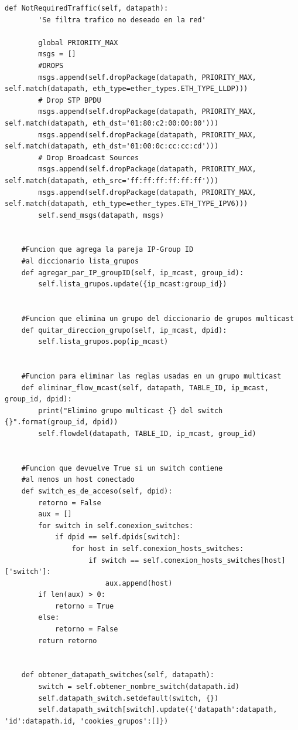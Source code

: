 \documentclass[12pt,a4paper,oneside]{book}
\begin{document}
\begin{lstlisting}[style=codigobase,  label = cod_correrP, caption= controlador.py]
    def NotRequiredTraffic(self, datapath):
        'Se filtra trafico no deseado en la red'

        global PRIORITY_MAX
        msgs = []
        #DROPS
        msgs.append(self.dropPackage(datapath, PRIORITY_MAX, self.match(datapath, eth_type=ether_types.ETH_TYPE_LLDP)))
        # Drop STP BPDU
        msgs.append(self.dropPackage(datapath, PRIORITY_MAX, self.match(datapath, eth_dst='01:80:c2:00:00:00')))
        msgs.append(self.dropPackage(datapath, PRIORITY_MAX, self.match(datapath, eth_dst='01:00:0c:cc:cc:cd')))
        # Drop Broadcast Sources
        msgs.append(self.dropPackage(datapath, PRIORITY_MAX, self.match(datapath, eth_src='ff:ff:ff:ff:ff:ff')))
        msgs.append(self.dropPackage(datapath, PRIORITY_MAX, self.match(datapath, eth_type=ether_types.ETH_TYPE_IPV6)))
        self.send_msgs(datapath, msgs)


    #Funcion que agrega la pareja IP-Group ID
    #al diccionario lista_grupos
    def agregar_par_IP_groupID(self, ip_mcast, group_id):
        self.lista_grupos.update({ip_mcast:group_id})


    #Funcion que elimina un grupo del diccionario de grupos multicast
    def quitar_direccion_grupo(self, ip_mcast, dpid):
        self.lista_grupos.pop(ip_mcast)


    #Funcion para eliminar las reglas usadas en un grupo multicast
    def eliminar_flow_mcast(self, datapath, TABLE_ID, ip_mcast, group_id, dpid):
        print("Elimino grupo multicast {} del switch {}".format(group_id, dpid))
        self.flowdel(datapath, TABLE_ID, ip_mcast, group_id)


    #Funcion que devuelve True si un switch contiene
    #al menos un host conectado
    def switch_es_de_acceso(self, dpid):
        retorno = False
        aux = []
        for switch in self.conexion_switches:
            if dpid == self.dpids[switch]:
                for host in self.conexion_hosts_switches:
                    if switch == self.conexion_hosts_switches[host]['switch']:
                        aux.append(host)
        if len(aux) > 0:
            retorno = True
        else:
            retorno = False
        return retorno


    def obtener_datapath_switches(self, datapath):
        switch = self.obtener_nombre_switch(datapath.id)
        self.datapath_switch.setdefault(switch, {})
        self.datapath_switch[switch].update({'datapath':datapath, 'id':datapath.id, 'cookies_grupos':[]})



\end{lstlisting}
\end{document}
